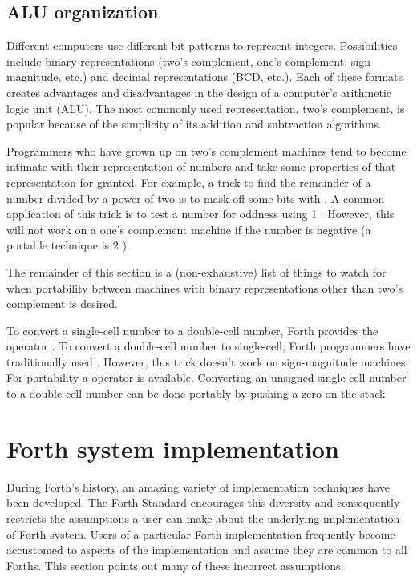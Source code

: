 \subsection{ALU organization} %

Different computers use different bit patterns to represent integers.
Possibilities include binary representations (two's complement, one's
complement, sign magnitude, etc.) and decimal representations (BCD,
etc.). Each of these formats creates advantages and disadvantages in
the design of a computer's arithmetic logic unit (ALU). The most
commonly used representation, two's complement, is popular because of
the simplicity of its addition and subtraction algorithms.

Programmers who have grown up on two's complement machines tend to
become intimate with their representation of numbers and take some
properties of that representation for granted. For example, a trick
to find the remainder of a number divided by a power of two is to mask
off some bits with . A common application of this trick is
to test a number for oddness using 1 . However, this will
not work on a one's complement machine if the number is negative (a
portable technique is 2 ).

The remainder of this section is a (non-exhaustive) list of things to
watch for when portability between machines with binary representations
other than two's complement is desired.

To convert a single-cell number to a double-cell number,  Forth
provides the operator . To convert a double-cell number to
single-cell, Forth programmers have traditionally used .
However, this trick doesn't work on sign-magnitude machines. For
portability a  operator is available. Converting an
unsigned single-cell number to a double-cell number can be done portably
by pushing a zero on the stack.


\section{Forth system implementation} %

During Forth's history, an amazing variety of implementation techniques
have been developed. The  Forth Standard encourages this diversity
and consequently restricts the assumptions a user can make about the
underlying implementation of  Forth system. Users of a particular
Forth implementation frequently become accustomed to aspects of the
implementation and assume they are common to all Forths. This section
points out many of these incorrect assumptions.

